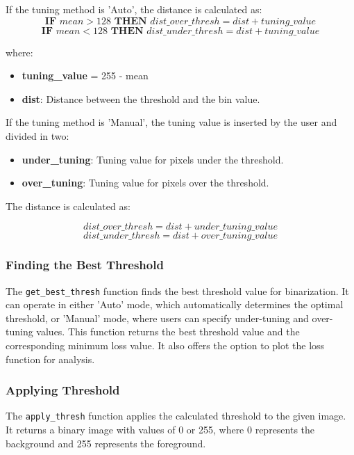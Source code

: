 \noindent
If the tuning method is 'Auto', the distance is calculated as:
$$
    \textbf{IF } {{mean}} > 128 \textbf{ THEN } {{dist\_over\_thresh}} = {{dist}} + {{tuning\_value}}
$$
$$
    \textbf{IF } {{mean}} < 128 \textbf{ THEN } {{dist\_under\_thresh}} = {{dist}} + {{tuning\_value}}
$$

where:
\begin{itemize}
    \item \textbf{{tuning\_value}} = 255 - mean
    \item \textbf{dist}: Distance between the threshold and the bin value.
\end{itemize}

\noindent
If the tuning method is 'Manual', the tuning value is inserted by the user and divided in two:
\begin{itemize}
    \item \textbf{under\_tuning}: Tuning value for pixels under the threshold.
    \item \textbf{over\_tuning}: Tuning value for pixels over the threshold.
\end{itemize}

\noindent
The distance is calculated as:

$$
    {{dist\_over\_thresh}} = {{dist}} + {{under\_tuning\_value}}
$$
$$
    {{dist\_under\_thresh}} = {{dist}} + {{over\_tuning\_value}}
$$

\subsubsection*{Finding the Best Threshold}

The \texttt{get\_best\_thresh} function finds the best threshold value for binarization. It can operate in either 'Auto' mode, which automatically determines the optimal threshold, or 'Manual' mode, where users can specify under-tuning and over-tuning values. This function returns the best threshold value and the corresponding minimum loss value. It also offers the option to plot the loss function for analysis.

\subsubsection*{Applying Threshold}

The \texttt{apply\_thresh} function applies the calculated threshold to the given image. It returns a binary image with values of 0 or 255, where 0 represents the background and 255 represents the foreground.

